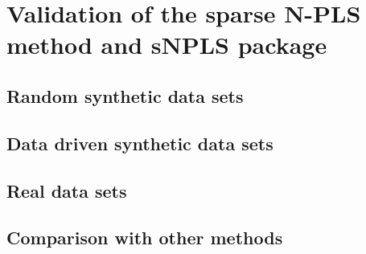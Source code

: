 
\chapter[Validation of the sparse N-PLS method and sNPLS package]{Validation of the sparse N-PLS method and sNPLS package}



\section{Random synthetic data sets}
\section{Data driven synthetic data sets}
\section{Real data sets}
\section{Comparison with other methods}